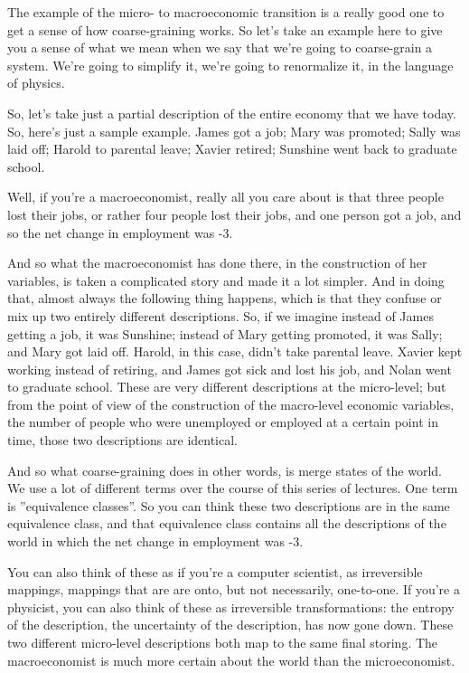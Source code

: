 \documentclass[]{article}
\begin{document}
The example of the micro-
to macroeconomic transition
is a really good one to get
a sense of how coarse-graining works.
So let's take an example here
to give you a sense of what we mean
when we say that we're going
to coarse-grain a system.
We're going to simplify it,
we're going to renormalize it,
in the language of physics.

So, let's take just a partial description
of the entire economy that we have today.
So, here's just a sample example.
James got a job; Mary was promoted;
Sally was laid off;
Harold to parental leave; Xavier retired;
Sunshine went back to graduate school.

Well, if you're a macroeconomist,
really all you care about
is that three people lost their jobs,
or rather four people lost their jobs,
and one person got a job,
and so the net change
in employment was -3.

And so what the macroeconomist
has done there,
in the construction of her variables,
is taken a complicated story
and made it a lot simpler.
And in doing that, almost always
the following thing happens,
which is that they confuse or mix up
two entirely different descriptions.
So, if we imagine instead of
James getting a job, it was Sunshine;
instead of Mary
getting promoted, it was Sally;
and Mary got laid off.
Harold, in this case,
didn't take parental leave.
Xavier kept working instead of retiring,
and James got sick and lost his job,
and Nolan went to graduate school.
These are very different descriptions
at the micro-level;
but from the point of view
of the construction
of the macro-level economic variables,
the number of people
who were unemployed or employed
at a certain point in time,
those two descriptions are identical.

And so what coarse-graining
does in other words,
is merge states of the world.
We use a lot of different terms
over the course
of this series of lectures.
One term is ''equivalence classes''.
So you can think these two descriptions
are in the same 
equivalence class,
and that equivalence class
contains all the descriptions of the world
in which the net change
in employment was -3.

You can also think of these
as if you're a computer scientist,
as irreversible mappings,
mappings that are are onto,
but not necessarily, one-to-one.
If you're a physicist, 
you can also think of these
as irreversible transformations:
the entropy of the description,
the uncertainty of the description,
has now gone down.
These two different
micro-level descriptions
both map to the same final storing.
The macroeconomist is much more certain
about the world than the microeconomist.
\end{document}

